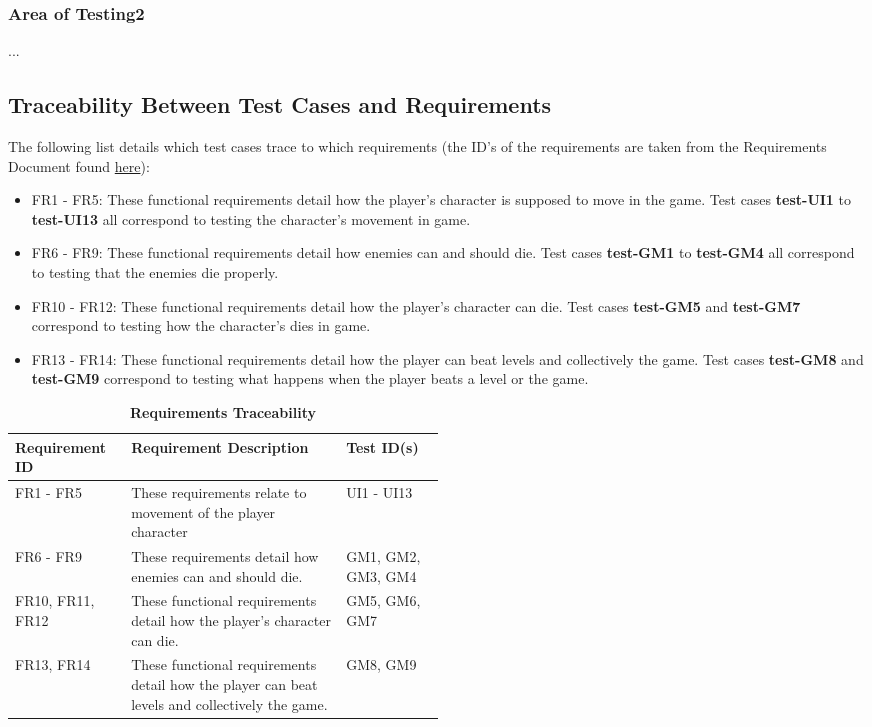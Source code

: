 \documentclass[12pt, titlepage]{article}
\begin{document}
\subsubsection{Area of Testing2}

...

\subsection{Traceability Between Test Cases and Requirements}

The following list details which test cases trace to which requirements (the ID's of the requirements are taken from the Requirements Document found \href{https://gitlab.cas.mcmaster.ca/jandricd/super-refactored-mario-bros/-/tree/master/Doc/SRS}{here}):

\begin{itemize}

\item{FR1 - FR5:}
These functional requirements detail how the player's character is supposed to move in the game. Test cases \textbf{test-UI1} to \textbf{test-UI13} all correspond to testing the character's movement in game.

\item{FR6 - FR9:}
These functional requirements detail how enemies can and should die. Test cases \textbf{test-GM1} to \textbf{test-GM4} all correspond to testing that the enemies die properly.

\item{FR10 - FR12:}
These functional requirements detail how the player's character can die. Test cases \textbf{test-GM5} and \textbf{test-GM7} correspond to testing how the character's dies in game.

\item{FR13 - FR14:}
These functional requirements detail how the player can beat levels and collectively the game. Test cases \textbf{test-GM8} and \textbf{test-GM9} correspond to testing what happens when the player beats a level or the game.

\end{itemize}

\begin{table}[H]
\caption{\bf Requirements Traceability}
\begin{tabular}{|l|p{0.5\linewidth}|l|}
\hline
\multicolumn{1}{|l}{\bfseries Requirement ID} & \multicolumn{1}{|l|}{\bfseries Requirement Description} & \multicolumn{1}{l|}{\bfseries Test ID(s)}\\
\hline
FR1 - FR5 & These requirements relate to movement of the player character & UI1 - UI13\\
\hline
FR6 - FR9 & These requirements  detail how enemies can and should die. & GM1, GM2, GM3, GM4 \\
\hline
FR10, FR11, FR12 & These functional requirements detail how the player’s character can die. & GM5, GM6, GM7\\
\hline
FR13, FR14 & These functional requirements detail how the player can beat levels and collectively the game. & GM8, GM9\\
\hline
\end{tabular}
\end{table}
\end{document}
